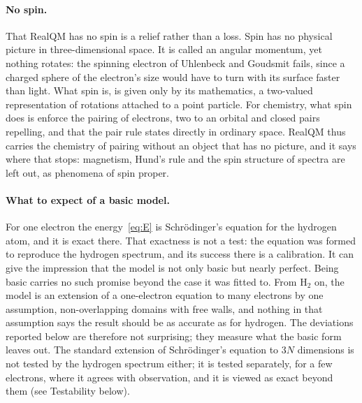 \documentclass[11pt]{article}
\begin{document}
\paragraph{No spin.} That RealQM has no spin is a relief rather than a loss. Spin has no physical picture
in three-dimensional space. It is called an angular momentum, yet nothing rotates: the
spinning electron of Uhlenbeck and Goudsmit fails, since a charged sphere of the electron's size would have to
turn with its surface faster than light. What spin is, is given only by its mathematics, a two-valued
representation of rotations attached to a point particle. For chemistry, what spin does is enforce the pairing
of electrons, two to an orbital and closed pairs repelling, and that the pair rule states directly in ordinary
space. RealQM thus carries the chemistry of pairing without an object that has no picture, and it says where
that stops: magnetism, Hund's rule and the spin structure of spectra are left out, as phenomena of spin proper.

\paragraph{What to expect of a basic model.} For one electron the energy~\eqref{eq:E} is Schr\"odinger's
equation for the hydrogen atom, and it is exact there. That exactness is not a test: the equation was
formed to reproduce the hydrogen spectrum, and its success there is a calibration. It can give the
impression that the model is not only basic but nearly perfect. Being basic carries no such promise beyond
the case it was fitted to. From H$_2$ on, the model is an extension of a one-electron equation to many
electrons by one assumption, non-overlapping domains with free walls, and nothing in that assumption says
the result should be as accurate as for hydrogen. The deviations reported below are therefore not
surprising; they measure what the basic form leaves out. The standard extension of Schr\"odinger's
equation to $3N$ dimensions is not tested by the hydrogen spectrum either; it is tested separately, for a few
electrons, where it agrees with observation, and it is viewed as exact beyond them (see Testability below).
\end{document}
